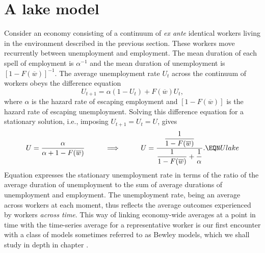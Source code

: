 
\section{A lake model}

  Consider an economy consisting of a continuum of {\it ex ante\/}
identical  workers  living in the environment described in the previous
section.  These workers move recurrently between unemployment
and employment.
The mean duration of each spell of employment
is $\alpha^{-1}$ and the mean duration of unemployment
is $[1 - F(\overline w)]^{-1}$.    The average unemployment rate
$U_t$
across the continuum of workers  obeys the difference equation
$$ U_{t+1} = \alpha (1 - U_t ) + F(\overline w) U_t ,  $$
where $\alpha$ is the hazard rate  of escaping employment
and $[1 - F(\overline w)]$ is the hazard rate of escaping unemployment.
Solving this difference equation for a stationary solution, i.e., imposing
$U_{t+1} = U_t = U$, gives
$$ U ={\alpha \over \alpha + 1 - F (\overline w) } \hskip1cm \Longrightarrow
\hskip1cm
U = {\displaystyle {1 \over 1 - F(\overline w)} \over
  \displaystyle { 1 \over  1 - F(\overline w)} + {1 \over \alpha}  } .
\EQN Ulake $$
Equation  expresses the stationary unemployment   rate in terms
of the ratio of the average duration of unemployment to the
sum of average durations of unemployment and employment.   The
unemployment rate, being an average across workers   at each    moment,
thus reflects the average
outcomes experienced by workers {\it across time}.
This way of linking economy-wide averages at a point in time with the
time-series average for a representative worker is our first
encounter with a class of models sometimes referred to as
Bewley models, which we  shall study in depth in chapter .

